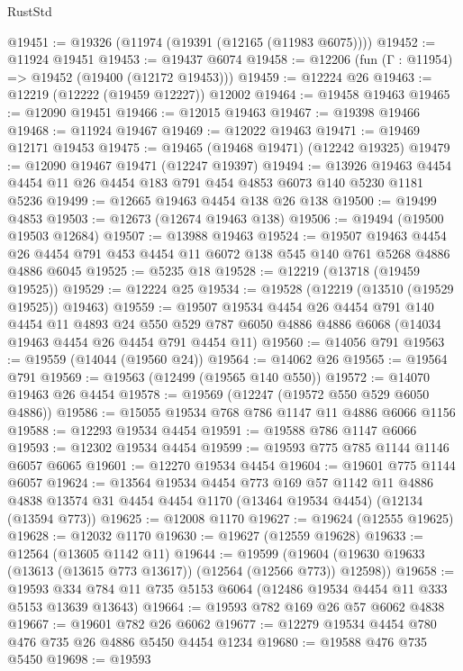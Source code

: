 \begin{lexlean}{RustStd}
\begin{coremodule}
@19451 := @19326 (@11974 (@19391 (@12165 (@11983 @6075))))
@19452 := @11924 @19451
@19453 := @19437 @6074
@19458 := @12206 (fun (Γ : @11954) => @19452 (@19400 (@12172 @19453)))
@19459 := @12224 @26
@19463 := @12219 (@12222 (@19459 @12227)) @12002
@19464 := @19458 @19463
@19465 := @12090 @19451
@19466 := @12015 @19463
@19467 := @19398 @19466
@19468 := @11924 @19467
@19469 := @12022 @19463
@19471 := @19469 @12171 @19453
@19475 := @19465 (@19468 @19471) (@12242 @19325)
@19479 := @12090 @19467 @19471 (@12247 @19397)
@19494 := @13926 @19463 @4454 @4454 @11 @26 @4454 @183 @791 @454 @4853 @6073 @140 @5230 @1181 @5236
@19499 := @12665 @19463 @4454 @138 @26 @138
@19500 := @19499 @4853
@19503 := @12673 (@12674 @19463 @138)
@19506 := @19494 (@19500 @19503 @12684)
@19507 := @13988 @19463
@19524 := @19507
    @19463
    @4454
    @26
    @4454
    @791
    @453
    @4454
    @11
    @6072
    @138
    @545
    @140
    @761
    @5268
    @4886
    @4886
    @6045
@19525 := @5235 @18
@19528 := @12219 (@13718 (@19459 @19525))
@19529 := @12224 @25
@19534 := @19528 (@12219 (@13510 (@19529 @19525)) @19463)
@19559 := @19507
    @19534
    @4454
    @26
    @4454
    @791
    @140
    @4454
    @11
    @4893
    @24
    @550
    @529
    @787
    @6050
    @4886
    @4886
    @6068
    (@14034 @19463 @4454 @26 @4454 @791 @4454 @11)
@19560 := @14056 @791
@19563 := @19559 (@14044 (@19560 @24))
@19564 := @14062 @26
@19565 := @19564 @791
@19569 := @19563 (@12499 (@19565 @140 @550))
@19572 := @14070 @19463 @26 @4454
@19578 := @19569 (@12247 (@19572 @550 @529 @6050 @4886))
@19586 := @15055 @19534 @768 @786 @1147 @11 @4886 @6066 @1156
@19588 := @12293 @19534 @4454
@19591 := @19588 @786 @1147 @6066
@19593 := @12302 @19534 @4454
@19599 := @19593 @775 @785 @1144 @1146 @6057 @6065
@19601 := @12270 @19534 @4454
@19604 := @19601 @775 @1144 @6057
@19624 := @13564
    @19534
    @4454
    @773
    @169
    @57
    @1142
    @11
    @4886
    @4838
    @13574
    @31
    @4454
    @4454
    @1170
    (@13464 @19534 @4454)
    (@12134 (@13594 @773))
@19625 := @12008 @1170
@19627 := @19624 (@12555 @19625)
@19628 := @12032 @1170
@19630 := @19627 (@12559 @19628)
@19633 := @12564 (@13605 @1142 @11)
@19644 := @19599
    (@19604 (@19630 @19633 (@13613 (@13615 @773 @13617)) (@12564 (@12566 @773)) @12598))
@19658 := @19593 @334 @784 @11 @735 @5153 @6064 (@12486 @19534 @4454 @11 @333 @5153 @13639 @13643)
@19664 := @19593 @782 @169 @26 @57 @6062 @4838
@19667 := @19601 @782 @26 @6062
@19677 := @12279 @19534 @4454 @780 @476 @735 @26 @4886 @5450 @4454 @1234
@19680 := @19588 @476 @735 @5450
@19698 := @19593

\end{coremodule}
\end{lexlean}
